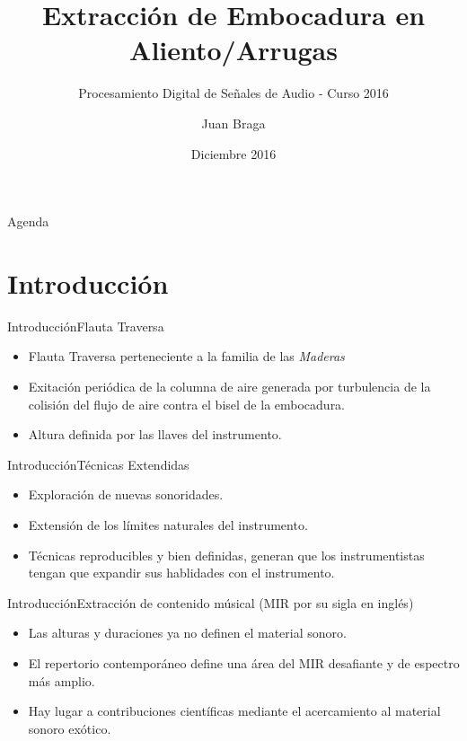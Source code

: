 \documentclass[aspectratio=169]{beamer}
\title{Extracción de Embocadura en Aliento/Arrugas}
\subtitle{Procesamiento Digital de Señales de Audio - Curso 2016}
\author{Juan Braga}%
\institute[IIE-FING-UDELAR] %
{
  Instituto de Ingeniería Eléctrica (IIE)\\
  Facultad de Ingeniería (FING)\\
  Universidad de la República (UDELAR)}
\date{Diciembre 2016}
\begin{document}
\begin{frame}
  \titlepage
\end{frame}

\begin{frame}{Agenda}
  \tableofcontents
\end{frame}

\section{Introducción}

\begin{frame}{Introducción}{Flauta Traversa}
  \begin{itemize}
  \item {
    Flauta Traversa perteneciente a la familia de las \textit{Maderas}
  }
  \item {
    Exitación periódica de la columna de aire generada por turbulencia de la colisión del flujo de aire contra el bisel de la embocadura.
  }
    \item {
    Altura definida por las llaves del instrumento.
  }
  \end{itemize}
\end{frame}

\begin{frame}{Introducción}{Técnicas Extendidas}
  \begin{itemize}
  \item {
    Exploración de nuevas sonoridades.
  }
  \item {
    Extensión de los límites naturales del instrumento.
  }
    \item {
    Técnicas reproducibles y bien definidas, generan que los instrumentistas tengan que expandir sus hablidades con el instrumento.
  }
  \end{itemize}
\end{frame}

\begin{frame}{Introducción}{Extracción de contenido músical (MIR por su sigla en inglés)}
  \begin{itemize}
  \item {
    Las alturas y duraciones ya no definen el material sonoro.
  }
  \item {
    El repertorio contemporáneo define una área del MIR desafiante y de espectro más amplio.
  }
    \item {
   	Hay lugar a contribuciones científicas mediante el acercamiento al material sonoro exótico.
  }
  \end{itemize}
\end{frame}
\end{document}
